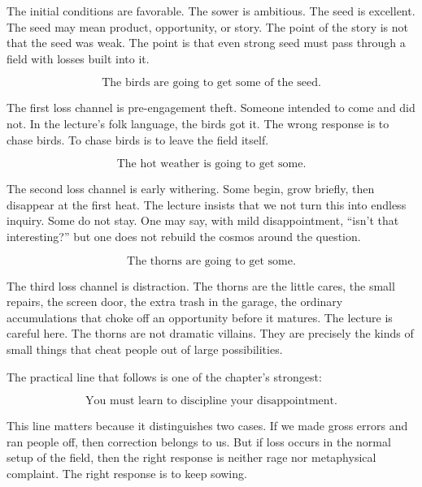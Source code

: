 The initial conditions are favorable. The sower is ambitious. The seed is excellent. The seed may mean product, opportunity, or story. The point of the story is not that the seed was weak. The point is that even strong seed must pass through a field with losses built into it.

\begin{equation}
\text{The birds are going to get some of the seed.}
\end{equation}

The first loss channel is pre-engagement theft. Someone intended to come and did not. In the lecture's folk language, the birds got it. The wrong response is to chase birds. To chase birds is to leave the field itself.

\begin{equation}
\text{The hot weather is going to get some.}
\end{equation}

The second loss channel is early withering. Some begin, grow briefly, then disappear at the first heat. The lecture insists that we not turn this into endless inquiry. Some do not stay. One may say, with mild disappointment, ``isn't that interesting?'' but one does not rebuild the cosmos around the question.

\begin{equation}
\text{The thorns are going to get some.}
\end{equation}

The third loss channel is distraction. The thorns are the little cares, the small repairs, the screen door, the extra trash in the garage, the ordinary accumulations that choke off an opportunity before it matures. The lecture is careful here. The thorns are not dramatic villains. They are precisely the kinds of small things that cheat people out of large possibilities.

The practical line that follows is one of the chapter's strongest:

\begin{equation}
\text{You must learn to discipline your disappointment.}
\end{equation}

This line matters because it distinguishes two cases. If we made gross errors and ran people off, then correction belongs to us. But if loss occurs in the normal setup of the field, then the right response is neither rage nor metaphysical complaint. The right response is to keep sowing.

